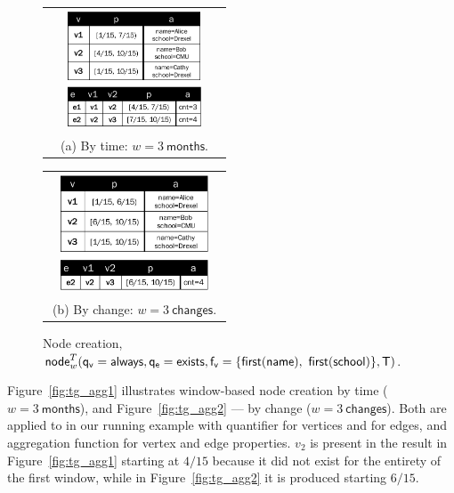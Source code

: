 \begin{figure}[t]
\begin{tabular}{@{}c@{}}
\includegraphics[width=2.0in,height=100pt]{figs/agg1.pdf} \\[\abovecaptionskip]
\small (a) By time: $w=3~\textsf{months}$.
\label{fig:tg_agg1}
\end{tabular}
\begin{tabular}{@{}c@{}}
\includegraphics[width=2.0in,height=100pt]{figs/agg2.pdf} \\[\abovecaptionskip]
\small (b) By change: $w=3~\textsf{changes}$.
\label{fig:tg_agg2}
\end{tabular}
\caption[]{Node creation,
  $\textsf{node}^T_w(\mathsf{q_v=always},\mathsf{q_e=exists,f_v=\{first(name),~first(school)\}},\mathsf{T})$.}
\vspace{-0.2cm}
\label{fig:tg_agg}
\vspace{-0.2cm}
\end{figure}

Figure~\ref{fig:tg_agg1} illustrates window-based node creation by
time ($w=3~\textsf{months}$), and Figure~\ref{fig:tg_agg2} --- by
change ($w=3~\textsf{changes}$).  Both are applied to  in
our running example with  quantifier for vertices and
 for edges, and  aggregation function for
vertex and edge properties.  $v_2$ is present in the result in
Figure~\ref{fig:tg_agg1} starting at $4/15$ because it did not exist
for the entirety of the first window, while in
Figure~\ref{fig:tg_agg2} it is produced starting $6/15$.

